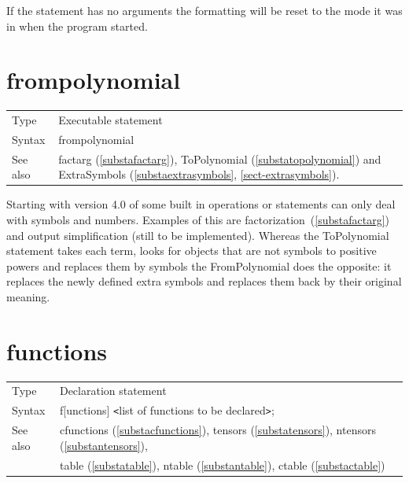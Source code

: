 
\noindent If the statement has no arguments the formatting will be reset to 
the mode it was in when the program started.\vspace{4mm}







\vspace{10mm}


\section{frompolynomial}
\label{substafrompolynomial}

\noindent \begin{tabular}{ll}
Type & Executable statement\\
Syntax & frompolynomial
\\ See also & factarg (\ref{substafactarg}), ToPolynomial 
(\ref{substatopolynomial}) and ExtraSymbols (\ref{substaextrasymbols},
\ref{sect-extrasymbols}).
\end{tabular} \vspace{4mm}

\noindent Starting with version 4.0 of \FORM{} some built in operations or
statements can only deal with symbols and numbers. Examples of this are 
factorization~(\ref{substafactarg}) and output simplification (still to be 
implemented). Whereas the ToPolynomial statement takes each term, looks for objects 
that are not symbols to positive powers and replaces them by symbols the 
FromPolynomial does the opposite: it replaces the newly defined extra 
symbols and replaces them back by their original meaning.
\vspace{10mm}

 
\section{functions}
\label{substafunctions}

\noindent \begin{tabular}{ll}
Type & Declaration statement\\
Syntax & f[unctions] {\tt<}list of functions to be declared{\tt>}; \\
See also & cfunctions (\ref{substacfunctions}), 
           tensors (\ref{substatensors}),
           ntensors (\ref{substantensors}), \\ &
           table (\ref{substatable}),
           ntable (\ref{substantable}),
           ctable (\ref{substactable})
\end{tabular} \vspace{4mm}

